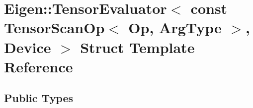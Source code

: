 \hypertarget{struct_eigen_1_1_tensor_evaluator_3_01const_01_tensor_scan_op_3_01_op_00_01_arg_type_01_4_00_01_device_01_4}{}\section{Eigen\+:\+:Tensor\+Evaluator$<$ const Tensor\+Scan\+Op$<$ Op, Arg\+Type $>$, Device $>$ Struct Template Reference}
\label{struct_eigen_1_1_tensor_evaluator_3_01const_01_tensor_scan_op_3_01_op_00_01_arg_type_01_4_00_01_device_01_4}
\subsection*{Public Types}
